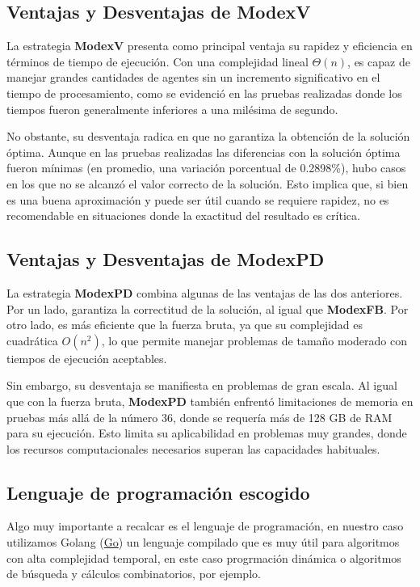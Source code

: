 \documentclass[letterpaper,10pt]{article}
\begin{document}
\subsection{Ventajas y Desventajas de ModexV}

La estrategia \textbf{ModexV} presenta como principal ventaja su rapidez y eficiencia en términos de tiempo de ejecución. Con una complejidad lineal $\Theta(n)$, es capaz de manejar grandes cantidades de agentes sin un incremento significativo en el tiempo de procesamiento, como se evidenció en las pruebas realizadas donde los tiempos fueron generalmente inferiores a una milésima de segundo.

No obstante, su desventaja radica en que no garantiza la obtención de la solución óptima. Aunque en las pruebas realizadas las diferencias con la solución óptima fueron mínimas (en promedio, una variación porcentual de 0.2898\%), hubo casos en los que no se alcanzó el valor correcto de la solución. Esto implica que, si bien es una buena aproximación y puede ser útil cuando se requiere rapidez, no es recomendable en situaciones donde la exactitud del resultado es crítica.

\subsection{Ventajas y Desventajas de ModexPD}

La estrategia \textbf{ModexPD} combina algunas de las ventajas de las dos anteriores. Por un lado, garantiza la correctitud de la solución, al igual que \textbf{ModexFB}. Por otro lado, es más eficiente que la fuerza bruta, ya que su complejidad es cuadrática $O(n^2)$, lo que permite manejar problemas de tamaño moderado con tiempos de ejecución aceptables.

Sin embargo, su desventaja se manifiesta en problemas de gran escala. Al igual que con la fuerza bruta, \textbf{ModexPD} también enfrentó limitaciones de memoria en pruebas más allá de la número 36, donde se requería más de 128 GB de RAM para su ejecución. Esto limita su aplicabilidad en problemas muy grandes, donde los recursos computacionales necesarios superan las capacidades habituales.
\subsection{Lenguaje de programación escogido}

Algo muy importante a recalcar es el lenguaje de programación, en nuestro caso utilizamos Golang (\href{https://go.dev/}{Go}) un lenguaje compilado que es muy útil para algoritmos con alta complejidad temporal, en este caso progrmación dinámica o algoritmos de búsqueda y cálculos combinatorios, por ejemplo.
\end{document}
